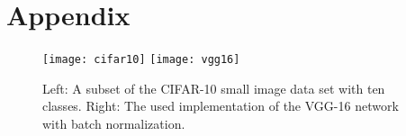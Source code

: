 \section{Appendix}
\begin{figure}[h!]
	\centering
	\texttt{[image: cifar10]}
	\texttt{[image: vgg16]}
	\caption{Left: A subset of the CIFAR-10 small image data set with ten classes. Right: The used implementation of the VGG-16 network with batch normalization.}	
	\label{fig:cifar-vgg}
\end{figure}